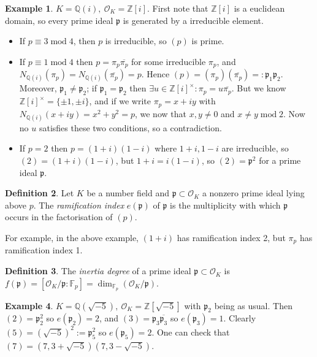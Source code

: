 \documentclass{article}
\newcommand{\Z}{\mathbb{Z}}
\newcommand{\Q}{\mathbb{Q}}
\newcommand{\F}{\mathbb{F}}
\newcommand{\Mod}{\operatorname{mod}}
\newcommand{\ri}{\mathcal{O}}
\newcommand{\ip}{\mathfrak{p}}
\theoremstyle{definition}
\newtheorem{defn}{Definition}[subsection]
\newtheorem{example}[defn]{Example}
\begin{document}
\begin{example}
$K=\Q(i),\ \ri_K=\Z[i]$. First note that $\Z[i]$ is a euclidean domain, so every prime ideal $\ip$ is generated by a irreducible element.
\begin{itemize}
\item If $p\equiv 3\Mod 4$, then $p$ is irreducible, so $(p)$ is prime.
\item If $p\equiv 1\Mod 4$ then $p=\pi_p\overline{\pi_p}$ for some irreducible $\pi_p$, and $N_{\Q(i)}(\pi_p)=N_{\Q(i)}\left(\overline{\pi_p}\right)=p.$ Hence $(p)=(\pi_p)\left(\overline{\pi_p}\right)=:\ip_1\ip_2$. Moreover, $\ip_1\neq\ip_2$; if $\ip_1=\ip_2$ then $\exists u\in\Z[i]^\times:\pi_p=u\overline{\pi_p}$. But we know $\Z[i]^\times=\{\pm 1,\pm i\}$, and if we write $\pi_p=x+iy$ with $N_{\Q(i)}(x+iy)=x^2+y^2=p$, we now that $x,y\neq 0$ and $x\neq y\Mod 2$. Now no $u$ satisfies these two conditions, so a contradiction.
\item If $p=2$ then $p=(1+i)(1-i)$ where $1+i,1-i$ are irreducible, so $(2)=(1+i)(1-i)$, but $1+i=i(1-i)$, so $(2)=\ip^2$ for a prime ideal $\ip$.
\end{itemize}
\end{example}

\begin{defn}
Let $K$ be a number field and $\ip\subset\ri_K$ a nonzero prime ideal lying above $p$. The \textit{ramification index} $e(\ip)$ of $\ip$ is the multiplicity with which $\ip$ occurs in the factorisation of $(p)$.
\end{defn}
For example, in the above example, $(1+i)$ has ramification index 2, but $\pi_p$ has ramification index 1.

\begin{defn}
The \textit{inertia degree} of a prime ideal $\ip\subset\ri_K$ is $f(\ip)=\left[\ri_K/\ip:\F_p\right]=\dim_{\F_p}\left(\ri_K/\ip\right)$. 
\end{defn}

\begin{example}
$K=\Q\left(\sqrt{-5}\right),\ \ri_K=\Z\left[\sqrt{-5}\right]$ with $\ip_2$ being as usual. Then $(2)=\ip_2^2$ so $e(\ip_2)=2$, and $(3)=\ip_3\overline{\ip_3}$ so $e(\ip_3)=1$. Clearly $(5)=\left(\sqrt{-5}\right)^2:=\ip_5^2$ so $e(\ip_5)=2$. One can check that $(7)=\left(7,3+\sqrt{-5}\right)\left(7,3-\sqrt{-5}\right)$.
\end{example}
\end{document}
